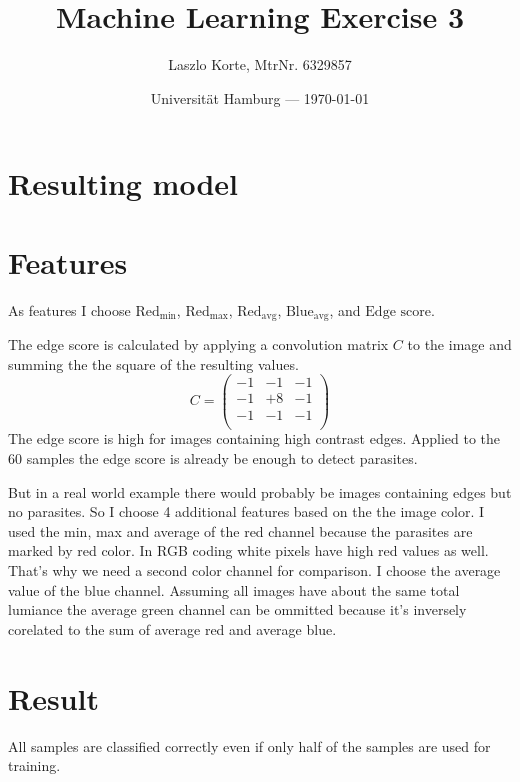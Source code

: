 \documentclass[parskip=half,a4paper,portrait]{scrartcl}
\title{Machine Learning Exercise 3}
\author{Laszlo Korte, MtrNr. 6329857}
\date{Universität Hamburg --- \today}
\begin{document}
\maketitle


\section*{Resulting model}

\label{model}



\section*{Features}

As features I choose $\text{Red}_{\text{min}}$, $\text{Red}_{\text{max}}$, $\text{Red}_{\text{avg}}$, $\text{Blue}_{\text{avg}}$, and $\text{Edge score}$.

The edge score is calculated by applying a convolution matrix $C$ to the image and summing the the square of the resulting values. \[C = \begin{pmatrix}
    -1 & -1 & -1\\
    -1 & +8 & -1\\
    -1 & -1 & -1\\
\end{pmatrix}\]
The edge score is high for images containing high contrast edges. Applied to the 60 samples the edge score is already be enough to detect parasites.

But in a real world example there would probably be images containing edges but no parasites. So I choose 4 additional features based on the the image color. I used the min, max and average of the red channel because the parasites are marked by red color. In RGB coding white pixels have high red values as well. That's why we need a second color channel for comparison. I choose the average value of the blue channel. Assuming all images have about the same total lumiance the average green channel can be ommitted because it's inversely corelated to the sum of average red and average blue.

\section*{Result}

All samples are classified correctly even if only half of the samples are used for training.
\end{document}
